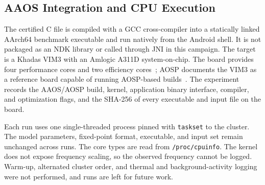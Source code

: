 \subsection{AAOS Integration and CPU Execution}
\label{sec:aaos}

The certified C file is compiled with a GCC cross-compiler into a statically linked AArch64 benchmark executable and run natively from the Android shell. It is not packaged as an NDK library or called through JNI in this campaign. The target is a Khadas VIM3 with an Amlogic A311D system-on-chip. The board provides four \Aseven{} performance cores and two \Athree{} efficiency cores~\cite{KhadasVIM3}; AOSP documents the VIM3 as a reference board capable of running AOSP-based builds~\cite{AOSPReferenceBoards}. The experiment records the AAOS/AOSP build, kernel, application binary interface, compiler, and optimization flags, and the SHA-256 of every executable and input file on the board.

Each run uses one single-threaded process pinned with \texttt{taskset} to the \Aseven{} cluster. The model parameters, fixed-point format, executable, and input set remain unchanged across runs. The core types are read from \texttt{/proc/cpuinfo}. The kernel does not expose frequency scaling, so the observed frequency cannot be logged. Warm-up, alternated cluster order, and thermal and background-activity logging were not performed, and \Athree{} runs are left for future work.

